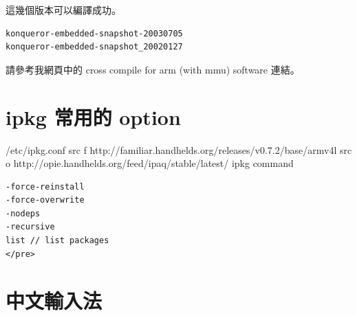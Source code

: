 \documentclass[12pt,a4paper]{article}
\begin{document}
\begin{CJK}{UTF8}{cwmu}
這幾個版本可以編譯成功。
\begin{verbatim}
konqueror-embedded-snapshot-20030705
konqueror-embedded-snapshot_20020127
\end{verbatim}
請參考我網頁中的 cross compile for arm (with mmu) software 連結。

\section{ipkg 常用的 option}
/etc/ipkg.conf
src f http://familiar.handhelds.org/releases/v0.7.2/base/armv4l
src o http://opie.handhelds.org/feed/ipaq/stable/latest/
ipkg command
\begin{verbatim}
-force-reinstall        
-force-overwrite 
-nodeps
-recursive
list // list packages
</pre>
\end{verbatim}

\section{中文輸入法}


\end{CJK}
\end{document}
